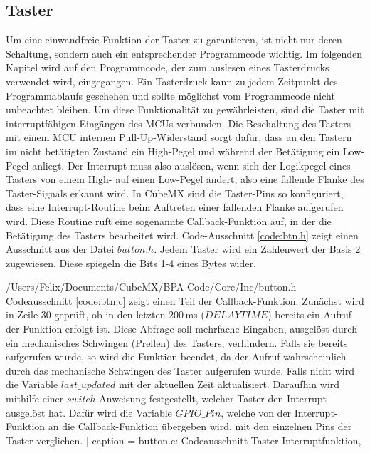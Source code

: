 
\subsection{Taster}
Um eine einwandfreie Funktion der Taster zu garantieren, ist nicht nur deren Schaltung, sondern auch ein entsprechender Programmcode wichtig. Im folgenden Kapitel wird auf den Programmcode, der zum auslesen eines Tasterdrucks verwendet wird, eingegangen. Ein Tasterdruck kann zu jedem Zeitpunkt des Programmablaufs geschehen und sollte möglichst vom Programmcode nicht unbeachtet bleiben. Um diese Funktionalität zu gewährleisten, sind die Taster mit interruptfähigen Eingängen des MCUs verbunden. Die Beschaltung des Tasters mit einem MCU internen Pull-Up-Widerstand sorgt dafür, dass an den Tastern im nicht betätigten Zustand ein High-Pegel und während der Betätigung ein Low-Pegel anliegt. Der Interrupt muss also auslösen, wenn sich der Logikpegel eines Tasters von einem High- auf einen Low-Pegel ändert, also eine fallende Flanke des Taster-Signals erkannt wird. In CubeMX sind die Taster-Pins so konfiguriert, dass eine Interrupt-Routine beim Auftreten einer fallenden Flanke aufgerufen wird. Diese Routine ruft eine sogenannte Callback-Funktion auf, in der die Betätigung des Tasters bearbeitet wird. Code-Ausschnitt \ref{code:btn.h} zeigt einen Ausschnitt aus der Datei $button.h$. Jedem Taster wird ein Zahlenwert der Basis 2 zugewiesen. Diese spiegeln die Bits 1-4 eines Bytes wider.

{/Users/Felix/Documents/CubeMX/BPA-Code/Core/Inc/button.h} 
Codeausschnitt \ref{code:btn.c} zeigt einen Teil der Callback-Funktion. Zunächst wird in Zeile 30 geprüft, ob in den letzten 200\,ms ($DELAYTIME$) bereits ein Aufruf der Funktion erfolgt ist. Diese Abfrage soll mehrfache Eingaben, ausgelöst durch ein mechanisches Schwingen (Prellen) des Tasters, verhindern. Falls sie bereits aufgerufen wurde, so wird die Funktion beendet, da der Aufruf wahrscheinlich durch das mechanische Schwingen des Taster aufgerufen wurde. Falls nicht wird die Variable $last\_updated$ mit der aktuellen Zeit aktualisiert. Daraufhin wird mithilfe einer $switch$-Anweisung festgestellt, welcher Taster den Interrupt ausgelöst hat. Dafür wird die Variable $GPIO\_Pin$, welche von der Interrupt-Funktion an die Callback-Funktion übergeben wird, mit den einzelnen Pins der Taster verglichen. 
[
caption = button.c: Codeausschnitt Taster-Interruptfunktion,
